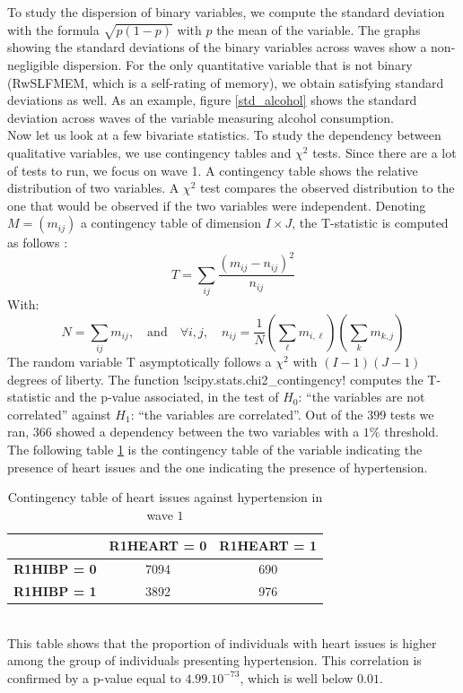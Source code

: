\documentclass[]{article}
\begin{document}
\noindent
To study the dispersion of binary variables, we compute the standard deviation with the formula $\sqrt{p(1-p)}$ with $p$ the mean of the variable. The graphs showing the standard deviations of the binary variables across waves show a non-negligible dispersion. For the only quantitative variable that is not binary (RwSLFMEM, which is a self-rating of memory), we obtain satisfying standard deviations as well. As an example, figure \ref{std_alcohol} shows the standard deviation across waves of the variable measuring alcohol consumption.\\

\noindent
Now let us look at a few bivariate statistics. To study the dependency between qualitative variables, we use contingency tables and $\chi^2$ tests. Since there are a lot of tests to run, we focus on wave 1. A contingency table shows the relative distribution of two variables. A $\chi^2$ test compares the observed distribution to the one that would be observed if the two variables were independent. Denoting $M=(m_{ij})$ a contingency table of dimension $I\times J$, the T-statistic is computed as follows \cite{chi2test}: 
\begin{equation}
	T = \sum_{ij}\frac{(m_{ij}-n_{ij})^2}{n_{ij}}
\end{equation}
With:
\begin{equation}
	N=\sum_{ij}m_{ij}, \quad \text{and}\quad \forall i,j,\quad n_{ij} = \frac{1}{N} \left(\sum_{\ell}m_{i,\ell}\right) \left(\sum_{k}m_{k,j}\right) 
\end{equation}
The random variable T asymptotically follows a $\chi^2$ with $(I-1)(J-1)$ degrees of liberty. The function \pyth!scipy.stats.chi2_contingency! computes the T-statistic and the p-value associated, in the test of $H_0$: “the variables are not correlated” against $H_1$: “the variables are correlated”.
Out of the $399$ tests we ran, $366$ showed a dependency between the two variables with a $1\%$ threshold. The following table \ref{contingency_table} is the contingency table of the variable indicating the presence of heart issues and the one indicating the presence of hypertension.
\begin{table}[!h]
	\centering
	\begin{tabular}{|c|c|c|}
		\hline
		& \textbf{R1HEART = 0} & \textbf{R1HEART = 1} \\
		\hline
		\textbf{R1HIBP = 0} & 7094 & 690 \\
		\hline
		\textbf{R1HIBP = 1} & 3892 & 976 \\
		\hline
	\end{tabular}
	\caption{Contingency table of heart issues against hypertension in wave $1$}
	\label{contingency_table}
\end{table}\\
This table shows that the proportion of individuals with heart issues is higher among the group of individuals presenting hypertension. This correlation is confirmed by a p-value equal to $4.99.10^{-73}$, which is well below $0.01$.\\
\end{document}
